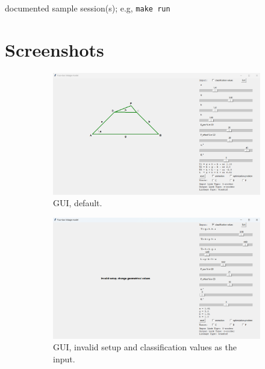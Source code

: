 \documentclass{article}
\begin{document}
documented sample session(s); e.g, \verb!make run!


\section{Screenshots}

\begin{figure}[h]
	\centering
	\begin{subfigure}{0.7\textwidth}
		\centering
		\includegraphics[width=\linewidth]{./figures/GUI_screenshots/GUI_default.png}
		\caption{GUI, default.}
		\label{fig:GUI_default}
	\end{subfigure}
	\vfill
	\begin{subfigure}{0.7\textwidth}
		\centering
		\includegraphics[width=\linewidth]{./figures/GUI_screenshots/GUI_invalid_setup.png}
		\caption{GUI, invalid setup and classification values as the input.}
		\label{fig:GUI_invalid}
	\end{subfigure}
	\vfill
	\begin{subfigure}{0.7\textwidth}
		\centering

\end{subfigure}
\end{figure}
\end{document}
